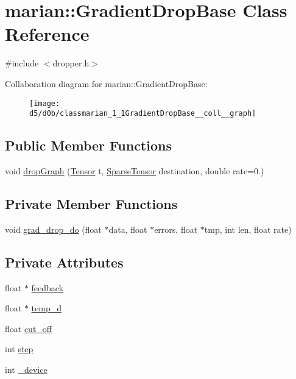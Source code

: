 \hypertarget{classmarian_1_1GradientDropBase}{}\section{marian\+:\+:Gradient\+Drop\+Base Class Reference}
\label{classmarian_1_1GradientDropBase}


{\ttfamily \#include $<$dropper.\+h$>$}



Collaboration diagram for marian\+:\+:Gradient\+Drop\+Base\+:
\nopagebreak
\begin{figure}[H]
\begin{center}
\leavevmode
\texttt{[image: d5/d0b/classmarian\_1\_1GradientDropBase\_\_coll\_\_graph]}
\end{center}
\end{figure}
\subsection*{Public Member Functions}
\begin{DoxyCompactItemize}
\item 
void \hyperlink{classmarian_1_1GradientDropBase_aff9094cc995db83c07424ceba9592028}{drop\+Graph} (\hyperlink{namespacemarian_a88b71ec34bb354564cddc24eb80f7e14}{Tensor} t, \hyperlink{namespacemarian_a5484064f1fce2661d0b27a5c02a9392b}{Sparse\+Tensor} destination, double rate=0.)
\end{DoxyCompactItemize}
\subsection*{Private Member Functions}
\begin{DoxyCompactItemize}
\item 
void \hyperlink{classmarian_1_1GradientDropBase_af88d41a0e4f999745653b61276426d8a}{grad\+\_\+drop\+\_\+do} (float $\ast$data, float $\ast$errors, float $\ast$tmp, int len, float rate)
\end{DoxyCompactItemize}
\subsection*{Private Attributes}
\begin{DoxyCompactItemize}
\item 
float $\ast$ \hyperlink{classmarian_1_1GradientDropBase_aba05eed3ccef8a7a9907265c5bb71113}{feedback}
\item 
float $\ast$ \hyperlink{classmarian_1_1GradientDropBase_a90fc3332c4dbfbb0e59e421db411be27}{temp\+\_\+d}
\item 
float \hyperlink{classmarian_1_1GradientDropBase_ae0a2f7a33c37a512aae27cc064a76055}{cut\+\_\+off}
\item 
int \hyperlink{classmarian_1_1GradientDropBase_acead9d9d021ef412b7e62776c96a5e51}{step}
\item 
int \hyperlink{classmarian_1_1GradientDropBase_a2ad2b7d1cb32b380dbf5e87672f0cf55}{\+\_\+device}
\end{DoxyCompactItemize}


